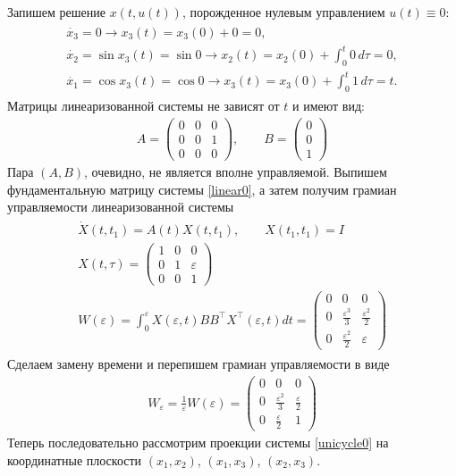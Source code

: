 \documentclass[../main.tex]{subfiles}
\begin{document}
 Запишем решение $ x(t,u(t)) $, порожденное нулевым управлением $ u(t) \equiv 0 $:
 \begin{gather*}
 \begin{gathered}
 \dot{x_3} = 0 \longrightarrow x_3(t) = x_3(0) + 0 = 0, \\
 \dot{x_2} = \sin x_3(t) = \sin 0 \longrightarrow x_2(t) = x_2(0) + \int_0^t 0 \, d\tau = 0,\\
 \dot{x_1} = \cos x_3(t) = \cos 0 \longrightarrow x_3(t) = x_3(0) + \int_0^t 1 \, d\tau = t.
 \end{gathered}
 \end{gather*}
 Матрицы линеаризованной системы не зависят от $ t $ и имеют вид:
 \begin{gather}\label{linear0}
 A = \begin{pmatrix}
 0 & 0 & 0 \\ 
 0 & 0 & 1 \\ 
 0 & 0 & 0
 \end{pmatrix}, \qquad B = \begin{pmatrix}
 0 \\ 
 0 \\ 
 1
 \end{pmatrix} 
 \end{gather}
 Пара $ (A,B) $, очевидно, не является вполне управляемой.
 Выпишем фундаментальную матрицу системы \eqref{linear0}, а затем получим грамиан управляемости линеаризованной системы
 \begin{gather*}
 \begin{gathered}
 \dot{X}(t,t_1) = A(t) X(t,t_1), \qquad X(t_1,t_1) = I \\
 X(t,\tau) = \begin{pmatrix}
 1 & 0 & 0 \\ 
 0 & 1 & \varepsilon \\ 
 0 & 0 & 1
 \end{pmatrix} \\
 W(\varepsilon) = \int_0^{\varepsilon}X(\varepsilon,t) B B^{\top} X^{\top}(\varepsilon,t)dt 
 =\begin{pmatrix}
 0 & 0 & 0 \\
 0 & \frac{\varepsilon^3}{3} & \frac{\varepsilon^2}{2} \\
 0 & \frac{\varepsilon^2}{2} & \varepsilon
 \end{pmatrix} 
 \end{gathered}
 \end{gather*}
 Сделаем замену времени и перепишем грамиан управляемости в виде
 \begin{gather*}
 W_{\varepsilon} = \frac{1}{\varepsilon}W(\varepsilon) =\begin{pmatrix}
 0 & 0 & 0 \\
 0 & \frac{\varepsilon^2}{3} & \frac{\varepsilon}{2} \\
 0 & \frac{\varepsilon}{2} & 1
 \end{pmatrix} 
 \end{gather*} 
 Теперь последовательно рассмотрим проекции системы \eqref{unicycle0} на координатные плоскости $ (x_1, x_2) $, $ (x_1, x_3) $, $ (x_2, x_3) $. \\
 
\end{document}
